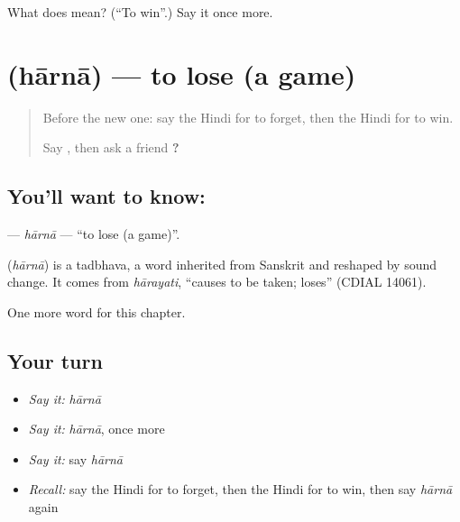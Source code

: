 \begin{tcolorbox}[breakable,colback=teal!4,colframe=teal!35!black,title={Before you move on}]
What does  mean? (\textquotedblleft{}To win\textquotedblright{}.) Say it once more.
\end{tcolorbox}
\section[\texorpdfstring{\hi{हारना} (hārnā)}{हारना (hārnā)}]{ (hārnā) — to lose (a game)}

\label{lesson:HI-C163-harna}



\begin{quote}
Before the new one: say the Hindi for to forget, then the Hindi for to win.

Say \textbf{   }, then ask a friend \textbf{ ?}
\end{quote}

\subsection*{You'll want to know: }
\textbf{} — \emph{hārnā} — \textquotedblleft{}to lose (a game)\textquotedblright{}.

\begin{cousinweb}
\textbf{} (\emph{hārnā}) is a tadbhava, a word inherited from Sanskrit and reshaped by sound change. It comes from \emph{hārayati}, \textquotedblleft{}causes to be taken; loses\textquotedblright{} (CDIAL 14061).
\end{cousinweb}

\begin{grammarlens}[title={What you've built}]
One more word for this chapter.
\end{grammarlens}

\subsection*{Your turn}
\begin{itemize}
\raggedright
  \item \emph{Say it:} \emph{hārnā}
  \item \emph{Say it:} \emph{hārnā}, once more
  \item \emph{Say it:} say \emph{hārnā}
  \item \emph{Recall:} say the Hindi for to forget, then the Hindi for to win, then say \emph{hārnā} again
\end{itemize}

